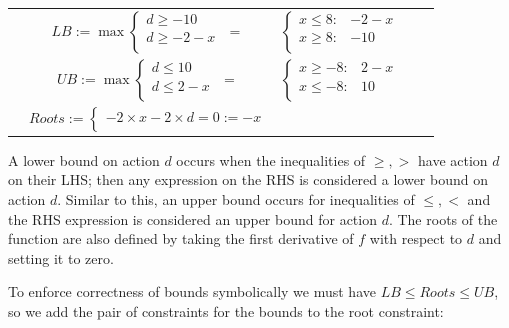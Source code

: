 \documentclass[letterpaper]{article}
\begin{document}
{\footnotesize
\begin{center}
\begin{tabular}{r c c c l}
&
\hspace{-9mm} $LB:= \max
  \begin{cases}
d \geq -10 \\ 
d \geq -2 -x\\ 
  \end{cases}$
$=$
&
\hspace{-4mm}
$  \begin{cases}
x \leq 8: & -2 -x \\ 
x \geq 8: &-10\\ 
  \end{cases}$
&
\hspace{-4mm} 
\\
&
\hspace{-4mm}
$UB:= \max
  \begin{cases}
d \leq 10 \\ 
d \leq 2 -x\\ 
  \end{cases}$
$=$
&
\hspace{-4mm}
$  \begin{cases}
x \geq -8: & 2 -x \\ 
x \leq -8: &10\\ 
  \end{cases}$
&
\hspace{-4mm} 
\\
&
\hspace{-4mm}
$Roots:= 
  \begin{cases}
-2\times x -2 \times d=0  := -x \\ 

  \end{cases}$
\end{tabular}
\end{center}
}

A lower bound on action $d$ occurs when the inequalities of $\geq ,>$ have action $d$ on their LHS; then any expression on the RHS is considered a lower bound on action $d$. Similar to this, an upper bound occurs for inequalities of $\leq , <$ and the RHS expression is considered an upper bound for action $d$. 
The roots of the function are also defined by taking the first derivative of $f$ with respect to $d$ and setting it to zero.

To enforce correctness of bounds symbolically we must have $LB \leq Roots \leq UB$, so we add the pair of constraints for the bounds to the root constraint:
\end{document}
